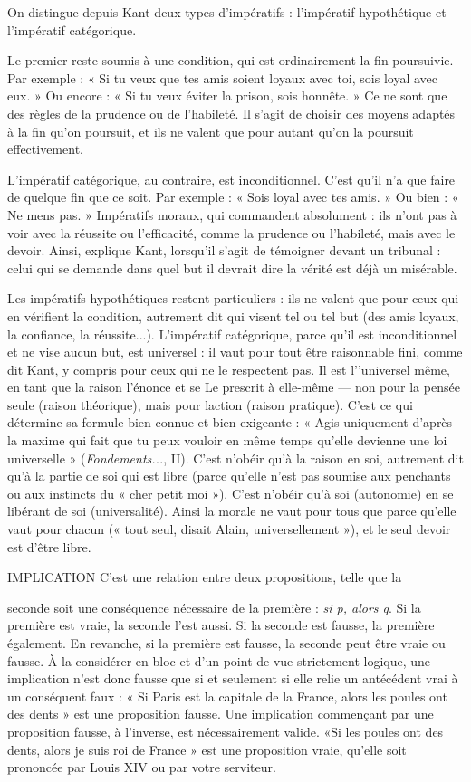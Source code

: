 On distingue depuis Kant deux types d’impératifs : l'impératif hypothétique
et l’impératif catégorique.

Le premier reste soumis à une condition, qui est ordinairement la fin poursuivie.
Par exemple : « Si tu veux que tes amis soient loyaux avec toi, sois loyal
avec eux. » Ou encore : « Si tu veux éviter la prison, sois honnête. » Ce ne sont
que des règles de la prudence ou de l’habileté. Il s’agit de choisir des moyens
adaptés à la fin qu’on poursuit, et ils ne valent que pour autant qu’on la poursuit
effectivement.

L’impératif catégorique, au contraire, est inconditionnel. C’est qu’il n’a
que faire de quelque fin que ce soit. Par exemple : « Sois loyal avec tes amis. »
Ou bien : « Ne mens pas. » Impératifs moraux, qui commandent absolument :
ils n’ont pas à voir avec la réussite ou l'efficacité, comme la prudence ou l’habileté,
mais avec le devoir. Ainsi, explique Kant, lorsqu'il s’agit de témoigner
devant un tribunal : celui qui se demande dans quel but il devrait dire la vérité
est déjà un misérable.

Les impératifs hypothétiques restent particuliers : ils ne valent que pour
ceux qui en vérifient la condition, autrement dit qui visent tel ou tel but (des
amis loyaux, la confiance, la réussite...). L’impératif catégorique, parce qu’il est
inconditionnel et ne vise aucun but, est universel : il vaut pour tout être raisonnable
fini, comme dit Kant, y compris pour ceux qui ne le respectent pas. Il est
l’'universel même, en tant que la raison l’énonce et se Le prescrit à elle-même —
non pour la pensée seule (raison théorique), mais pour laction (raison
pratique). C’est ce qui détermine sa formule bien connue et bien exigeante :
« Agis uniquement d’après la maxime qui fait que tu peux vouloir en même
temps qu'elle devienne une loi universelle » ({\it Fondements...}, II). C’est n’obéir
qu’à la raison en soi, autrement dit qu’à la partie de soi qui est libre (parce
qu’elle n’est pas soumise aux penchants ou aux instincts du « cher petit moi »).
C’est n’obéir qu’à soi (autonomie) en se libérant de soi (universalité). Ainsi la
morale ne vaut pour tous que parce qu’elle vaut pour chacun (« tout seul, disait
Alain, universellement »), et le seul devoir est d’être libre.

IMPLICATION C'est une relation entre deux propositions, telle que la

seconde soit une conséquence nécessaire de la première : {\it si
p, alors q}. Si la première est vraie, la seconde l’est aussi. Si la seconde est fausse,
la première également. En revanche, si la première est fausse, la seconde peut
être vraie ou fausse. À la considérer en bloc et d’un point de vue strictement
logique, une implication n’est donc fausse que si et seulement si elle relie un
antécédent vrai à un conséquent faux : « Si Paris est la capitale de la France,
alors les poules ont des dents » est une proposition fausse. Une implication
commençant par une proposition fausse, à l’inverse, est nécessairement valide.
«Si les poules ont des dents, alors je suis roi de France » est une proposition
vraie, qu’elle soit prononcée par Louis XIV ou par votre serviteur.

